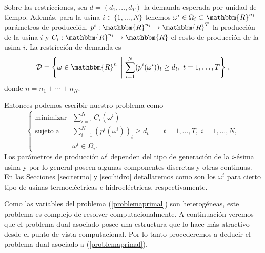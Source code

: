 \documentclass[a4paper,12pt]{report}
\newcommand{\RR}{\mathbbm{R}}
\newcommand{\Rn}{\RR^n}
\newcommand{\om}{\omega}
\newcommand{\cD}{\mathcal{D}}
\newcommand{\arr}{\rightarrow}
\begin{document}
Sobre las restricciones, sea $d=(d_1,\ldots,d_T)$ la demanda esperada por unidad de tiempo. Adem\'as, para la usina $i\in\{1,\ldots,N\}$ tenemos $\om^i\in\Omega_i\subset\RR^{n_i}$ par\'ametros de producci\'on, $p^i:\RR^{n_i}\arr\RR^T$ la producci\'on de la usina $i$ y $C_i:\RR^{n_i}\arr\RR$ el costo de producci\'on de la usina $i$. La restricci\'on de demanda es 
$$\cD=\left\{\om\in\Rn\;\left|\;\sum_{i=1}^{N}(p^i(\om^i))_t\geq d_t,\;t=1,\ldots,T\right\}\right.,$$
donde $n=n_1+\cdots+n_N$.

Entonces podemos escribir nuestro problema como
\begin{equation}\label{problemaprimal}
\left\{
 \begin{array}{rl}
  \mathrm{minimizar}&\sum_{i=1}^{N}C_i(\om^i)\\
  \mathrm{sujeto\;a}&\sum_{i=1}^N(p^i(\om^i))_t\geq d_t\qquad t=1,\ldots,T,\;i=1,\ldots,N,\\
&  \om^i\in\Omega_i.	
 \end{array}
\right.
\end{equation}
Los par\'ametros de producci\'on $\om^i$ dependen del tipo de generaci\'on de la $i$-\'esima usina y por lo general poseen algunas componentes discretas y otras continuas. En las Secciones \ref{sec:termo} y \ref{sec:hidro} detallaremos como son los $\om^i$ para cierto tipo de usinas termoel\'ectricas e hidroel\'ectricas, respectivamente.

Como las variables del problema (\ref{problemaprimal}) son heterog\'eneas, este problema es complejo de resolver computacionalmente. A continuaci\'on veremos que el problema dual asociado posee una estructura que lo hace m\'as atractivo desde el punto de vista computacional. Por lo tanto procederemos a deducir el problema dual asociado a (\ref{problemaprimal}).
\end{document}
